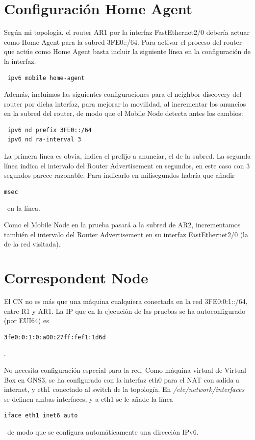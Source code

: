 \documentclass{article}
\begin{document}
\section{Configuración Home Agent}
Según mi topología, el router AR1 por la interfaz FastEthernet2/0 debería actuar como Home Agent para la subred 3FE0::/64. Para activar el proceso del router que actúe como Home Agent basta incluir la siguiente línea en la configuración de la interfaz:
\begin{BVerbatim}
 ipv6 mobile home-agent
\end{BVerbatim}

Además, incluimos las siguientes configuraciones para el neighbor discovery del router por dicha interfaz, para mejorar la movilidad, al incrementar los anuncios en la subred del router, de modo que el Mobile Node detecta antes los cambios:

\begin{BVerbatim}
 ipv6 nd prefix 3FE0::/64
 ipv6 nd ra-interval 3
\end{BVerbatim}

La primera línea es obvia, indica el prefijo a anunciar, el de la subred. La segunda línea indica el intervalo del Router Advertisement en segundos, en este caso con 3 segundos parece razonable. Para indicarlo en milisegundos habría que añadir 
\begin{BVerbatim}
msec
\end{BVerbatim}
\ en la línea.

Como el Mobile Node en la prueba pasará a la subred de AR2, incrementamos también el intervalo del Router Advertisement en su interfaz FastEthernet2/0 (la de la red visitada).

\section{Correspondent Node}
El CN no es más que una máquina cualquiera conectada en la red 3FE0:0:1::/64, entre R1 y AR1. La IP que en la ejecución de las pruebas se ha autoconfigurado (por EUI64) es 
\begin{BVerbatim}
3fe0:0:1:0:a00:27ff:fef1:1d6d
\end{BVerbatim}
.

No necesita configuración especial para la red. Como máquina virtual de Virtual Box en GNS3, se ha configurado con la interfaz eth0 para el NAT con salida a internet, y eth1 conectado al switch de la topología. En \textit{/etc/network/interfaces} se definen ambas interfaces, y a eth1 se le añade la línea 
\begin{BVerbatim}
iface eth1 inet6 auto
\end{BVerbatim}
\ de modo que se configura automáticamente una dirección IPv6.
\end{document}
